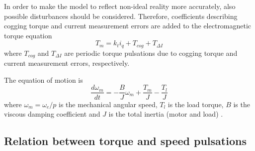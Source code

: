In order to make the model to reflect non-ideal reality more accurately, also possible disturbances should be considered. Therefore, coefficients describing cogging torque and current measurement errors are added to the electromagnetic torque equation \cite{ILC:2004}
\begin{equation}
    T_m = k_t i_{q} + T_{cog} + T_{\Delta I}
    \label{torque_eq3}
\end{equation}
where $T_{cog}$ and $T_{\Delta I}$ are periodic torque pulsations due to cogging torque and current measurement errors, respectively.

The equation of motion is
\begin{equation}
    \frac{d \omega_m}{dt} = -\frac{B}{J}\omega_m + \frac{T_m}{J} - \frac{T_l}{J}
    \label{PMSM_dynamics}
\end{equation}
where $\omega_m = \omega_e / p$ is the mechanical angular speed, $T_l$ is the load torque, $B$ is the viscous damping coefficient and $J$ is the total inertia (motor and load) \cite{ILC:2005}. 

\subsection{Relation between torque and speed pulsations}


